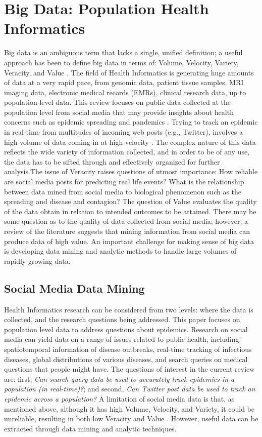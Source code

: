 \documentclass[sigconf]{acmart}
\begin{document}
\section{Big Data: Population Health Informatics}

Big data is an ambiguous term that lacks a single, unified definition; a useful approach has been to define big data in terms of: Volume, Velocity, Variety, Veracity, and Value \cite{demchenko12}. The field of Health Informatics is generating huge amounts of data at a very rapid pace, from genomic data, patient tissue samples, MRI imaging data, electronic medical records (EMRs), clinical research data, up to population-level data. This review focuses on public data collected at the population level from social media that may provide insights about health concerns such as epidemic spreading and pandemics  \cite{hay13, herland14}. Trying to track an epidemic in real-time from multitudes of incoming web posts (e.g., Twitter), involves a high volume of data coming in at high velocity \cite{lamb13, paul14}. The complex nature of this data reflects the wide variety of information collected, and in order to be of any use, the data has to be sifted through and effectively organized for further analysis.The issue of Veracity raises questions of utmost importance: How reliable are social media posts for predicting real life events? What is the relationship between data mined from social media to biological phenomenon such as the spreading and disease and contagion? The question of Value evaluates the quality of the data obtain in relation to intended outcomes to be attained. There may be some question as to the quality of data collected from social media; however, a review of the literature suggests that mining information from social media can produce data of high value. An important challenge for making sense of big data is developing data mining and analytic methods to handle large volumes of rapidly growing data. 


\subsection{Social Media Data Mining}

Health Informatics research can be considered from two levels: where the data is collected, and the research questions being addressed. This paper focuses on population level data to address questions about epidemics.  Research on social media can yield data on a range of issues related to public health, including: spatiotemporal information of disease outbreaks, real-time tracking of infectious diseases, global distributions of various diseases, and search queries on medical questions that people might have. The questions of interest in the current review are: first, \textit{Can search query data be used to accurately track epidemics in a population (in real-time)?};  and second, \textit{Can Twitter post data be used to track an epidemic across a population?} A limitation of social media data is that, as mentioned above, although it has high Volume, Velocity, and Variety, it could be unreliable, resulting in both low Veracity and Value \cite{hay14, lazer14}. However, useful data can be extracted through data mining and analytic techniques. 
\end{document}
